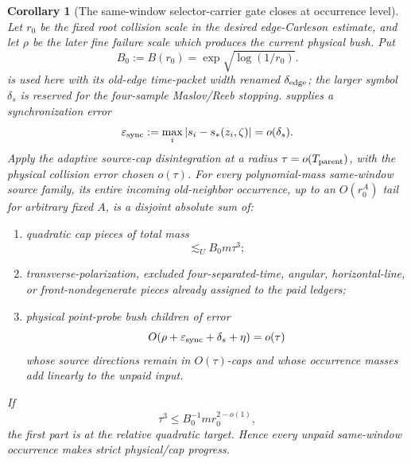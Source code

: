 \documentclass[10pt]{article}
\newtheorem{corollary}[theorem]{Corollary}
\begin{document}
\begin{corollary}[The same-window selector-carrier gate closes at occurrence level]
\label{cor:v081-same-window-carrier-reduction}
Let \(r_0\) be the fixed root collision scale in the desired edge-Carleson estimate, and let
\(\rho\) be the later fine failure scale which produces the current physical bush.  Put
\[
B_0:=B(r_0)=\exp\sqrt{\log(1/r_0)}.
\]
 is used here with its old-edge time-packet
width renamed \(\delta_{\rm edge}\); the larger symbol \(\delta_s\) is reserved for the
four-sample Maslov/Reeb stopping.   supplies a synchronization error
\[
\varepsilon_{\rm sync}
:=
\max_i|s_i-s_*(z_i,\zeta)|
=o(\delta_s).
\]
Apply the adaptive source-cap disintegration at a radius \(\tau=o(T_{\rm parent})\), with the physical collision error chosen
\(o(\tau)\).  For every polynomial-mass same-window source family,
its entire incoming
old-neighbor occurrence, up to an \(O(r_0^A)\) tail for arbitrary fixed \(A\), is a disjoint absolute
sum of:
\begin{enumerate}[label=\textnormal{(\roman*)}]
\item quadratic cap pieces of total mass
\[
\lesssim_U B_0m\tau^3;
\]
\item transverse-polarization, excluded four-separated-time, angular, horizontal-line, or
front-nondegenerate pieces already assigned to the paid ledgers;
\item physical point-probe bush children of error
\[
O(\rho+\varepsilon_{\rm sync}+\delta_s+\eta)=o(\tau)
\]
whose source directions remain in \(O(\tau)\)-caps and whose occurrence masses add linearly to the
unpaid input.
\end{enumerate}
If
\[
\tau^3\le B_0^{-1}mr_0^{2-o(1)},
\]
the first part is at the relative quadratic target.  Hence every unpaid same-window occurrence
makes strict physical/cap progress.
\end{corollary}
\end{document}
